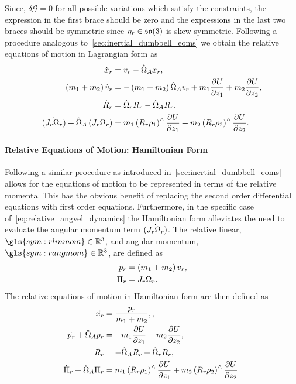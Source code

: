 Since, \( \delta \mathcal{G} = 0 \) for all possible variations which satisfy the constraints, the expression in the first brace should be zero and the expressions in the last two braces should be symmetric since \( \eta_r \in \mathfrak{so}(3) \) is skew-symmetric.
Following a procedure analogous to~\cref{sec:inertial_dumbbell_eoms} we obtain the relative equations of motion in Lagrangian form as
\begin{align}
    \dot{x}_r &= v_r - \hat{\Omega}_A x_r, \label{eq:relative_position_dynamics}\\
    \left( m_1 + m_2 \right) \dot{v}_r  &= -\left( m_1 + m_2 \right) \hat{\Omega}_A v_r + m_1 \frac{\partial U}{\partial z_1} + m_2 \frac{\partial U}{\partial z_2}, \label{eq:relative_velocity_dynamics} \\
    \dot{R}_r &= \hat{\Omega}_r R_r  - \hat{\Omega}_A R_r , \label{eq:relative_attitude_dynamics}\\
    \dot{\left( J_r  \Omega_r \right)} + \hat{\Omega}_A \left( J_r  \Omega_r \right) &= m_1 \left( R_r  \rho_1 \right)^\wedge \frac{\partial U}{\partial z_1} + m_2 \left( R_r  \rho_2 \right)^\wedge \frac{\partial U}{\partial z_2}.\label{eq:relative_angvel_dynamics}
\end{align}

\paragraph{Relative Equations of Motion: Hamiltonian Form}
Following a similar procedure as introduced in~\cref{sec:inertial_dumbbell_eoms} allows for the equations of motion to be represented in terms of the relative momenta.
This has the obvious benefit of replacing the second order differential equations with first order equations.
Furthermore, in the specific case of~\cref{eq:relative_angvel_dynamics} the Hamiltonian form alleviates the need to evaluate the angular momentum term \( \dot{\left( J_r \Omega_r \right)}\).
The relative linear, \( \gls{sym:rlinmom} \in \R^3 \), and angular momentum, \( \gls{sym:rangmom} \in \R^3 \), are defined as
\begin{align}
    p_r &= \left( m_1 + m_2 \right) v_r, \label{eq:relative_linear_momentum}\\ 
    \Pi_r &= J_r \Omega_r. \label{eq:relative_angular_momentum}
\end{align}
The relative equations of motion in Hamiltonian form are then defined as
\begin{align}
    \dot {x_r} &= \frac{p_r}{m_1 + m_2}, \label{eq:relative_position_dynamics_hamiltonian},\\
    \dot {p_r} + \hat{\Omega}_A p_r &= - m_1 \frac{\partial U}{\partial z_1} - m_2 \frac{\partial U}{\partial z_2}, \label{eq:relative_velocity_dynamics_hamiltonian}\\
    \dot{R}_r &= - \hat{\Omega}_A R_r +\hat{\Omega}_r R_r, \label{eq:relative_attitude_dynamics_hamiltonian}\\
    \dot{\Pi}_r + \hat{\Omega}_A \Pi_r &= m_1 \left( R_r \rho_1 \right)^\wedge \frac{\partial U}{\partial z_1} + m_2 \left( R_r \rho_2 \right)^\wedge \frac{\partial U}{\partial z_2}. \label{eq:relative_angvel_dynamics_hamiltonian}
\end{align}

